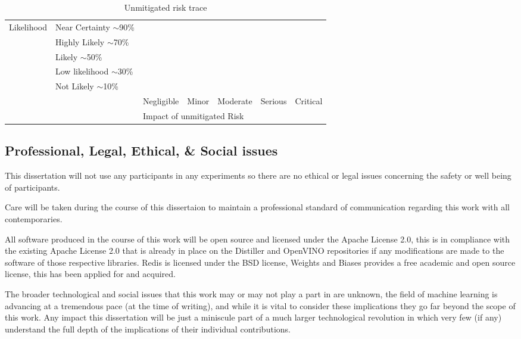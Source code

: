 \documentclass[../../D1.tex]{subfiles}
\begin{document}
\begin{table}[]
    \begin{tabular}{@{}|l|l|l|l|l|l|l|@{}}
        \toprule
        \multirow{7}{*}{Likelihood} & Near Certainty $\sim$90\% &            &       &          &         &          \\ \cmidrule(l){2-7} 
                                    & Highly Likely $\sim$70\%  &            &       &          &         &          \\ \cmidrule(l){2-7} 
                                    & Likely $\sim$50\%         &            &       &          &         &          \\ \cmidrule(l){2-7} 
                                    & Low likelihood $\sim$30\% &            &       &          &         &          \\ \cmidrule(l){2-7} 
                                    & Not Likely $\sim$10\%     &            &       &          &         &          \\ \cmidrule(l){2-7} 
                                    & \multirow{2}{*}{}         & Negligible & Minor & Moderate & Serious & Critical \\ \cmidrule(l){3-7} 
                                    &                           & \multicolumn{5}{l|}{Impact of unmitigated Risk}  \\ \bottomrule
        \end{tabular}
    \caption{Unmitigated risk trace}
\end{table}




\subsection{Professional, Legal, Ethical, \& Social issues}
This dissertation will not use any participants in any experiments so there are no ethical or legal issues concerning the safety or well being of participants.


Care will be taken during the course of this dissertaion to maintain a professional standard of communication regarding this work with all contemporaries. 


All software produced in the course of this work will be open source and licensed under the Apache License 2.0, this is in  compliance with the existing Apache License 2.0 that is already in place on the Distiller and OpenVINO repositories if any modifications are made to the software of those respective libraries.
Redis is licensed under the BSD license, Weights and Biases provides a free academic and open source license, this has been applied for and acquired.


The broader technological and social issues that this work may or may not play a part in are unknown, the field of machine learning is advancing at a tremendous pace (at the time of writing), and while it is vital to consider these implications they go far beyond the scope of this work. 
Any impact this dissertation will be just a miniscule part of a much larger technological revolution in which very few (if any) understand the full depth of the implications of their individual contributions.
\end{document}
